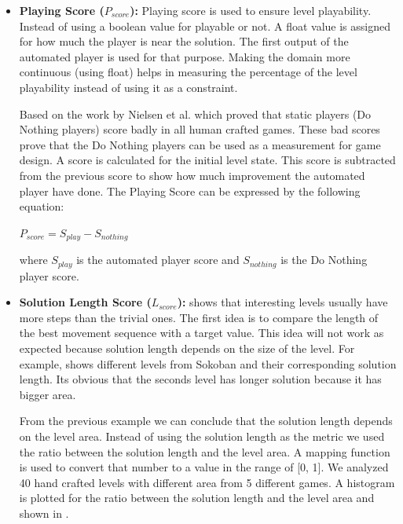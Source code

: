 \begin{itemize}
	\item \textbf{Playing Score ($P_{score}$):} Playing score is used to ensure level playability. Instead of using a boolean value for playable or not. A float value is assigned for how much the player is near the solution. The first output of the automated player is used for that purpose. Making the domain more continuous (using float) helps in measuring the percentage of the level playability instead of using it as a constraint.\\\par
	
	Based on the work by Nielsen et al.\cite{gvgpPerformanceProfiles} which proved that static players (Do Nothing players) score badly in all human crafted games. These bad scores prove that the Do Nothing players can be used as a measurement for game design. A score is calculated for the initial level state. This score is subtracted from the previous score to show how much improvement the automated player have done. The Playing Score can be expressed by the following equation:
	\begin{center}$ P_{score} = S_{play} - S_{nothing}$\end{center}
	where $S_{play}$ is the automated player score and $S_{nothing}$ is the Do Nothing player score.
	
	\item\textbf{Solution Length Score ($L_{score}$):}  shows that interesting levels usually have more steps than the trivial ones. The first idea is to compare the length of the best movement sequence with a target value. This idea will not work as expected because solution length depends on the size of the level. For example,  shows different levels from Sokoban and their corresponding solution length. Its obvious that the seconds level has longer solution because it has bigger area.
	
	
	From the previous example we can conclude that the solution length depends on the level area. Instead of using the solution length as the metric we used the ratio between the solution length and the level area. A mapping function is used to convert that number to a value in the range of [0, 1]. We analyzed 40 hand crafted levels with different area from 5 different games. A histogram is plotted for the ratio between the solution length and the level area and shown in .
	

\end{itemize}
